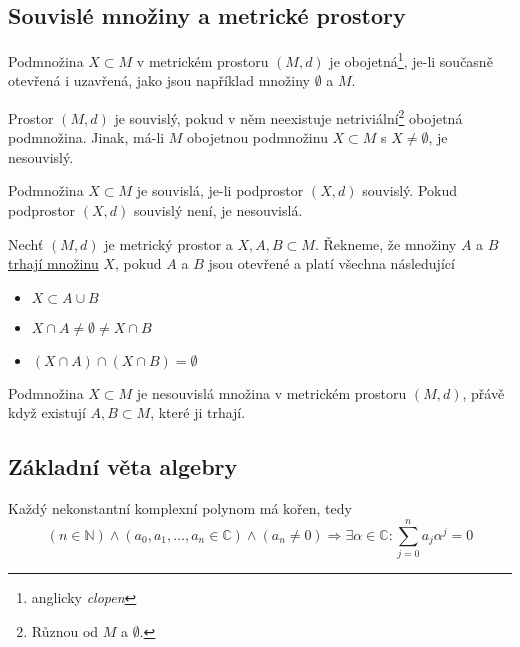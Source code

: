 \documentclass[../main.tex]{subfiles}
\begin{document}
\subsection{Souvislé množiny a metrické prostory}

\begin{definition}
    Podmnožina $X \subset M$ v metrickém prostoru $(M,d)$ je obojetná\footnote{anglicky \textit{clopen}}, je-li současně
    otevřená i uzavřená, jako jsou například množiny $\emptyset$ a $M$.
\end{definition}

\begin{definition}
    Prostor $(M,d)$ je souvislý, pokud v něm neexistuje netriviální\footnote{Různou od $M$ a $\emptyset$.} obojetná podmnožina.
    Jinak, má-li $M$ obojetnou podmnožinu $X \subset M$ s $X \neq \emptyset$, je nesouvislý.
\end{definition}

\begin{definition}
    Podmnožina $X\subset M$ je souvislá, je-li podprostor $(X,d)$ souvislý.
    Pokud podprostor $(X,d)$ souvislý není, je nesouvislá.
\end{definition}

\begin{definition}
    Nechť $(M,d)$ je metrický prostor a $X,A,B \subset M$. Řekneme, že množiny $A$ a $B$ \underline{trhají množinu} $X$, pokud
    $A$ a $B$ jsou otevřené a platí všechna následující 
    \begin{itemize}
        \item $X \subset A \cup B$
        \item $X \cap A \neq \emptyset \neq X \cap B$
        \item $(X \cap A) \cap (X \cap B) = \emptyset$
    \end{itemize}
\end{definition}

\begin{lemma}
    Podmnožina $X \subset M$ je nesouvislá množina v metrickém prostoru $(M,d)$, přávě
    když existují $A,B \subset M$, které ji trhají.
\end{lemma}

\subsection{Základní věta algebry}

\begin{theorem}
    Každý nekonstantní komplexní polynom má kořen, tedy
    \[ (n\in \mathbb{N})\land (a_0, a_1, \dots, a_n \in \mathbb{C}) \land (a_n \neq 0) \Rightarrow \exists \alpha \in \mathbb{C}: \sum_{j=0}^{n}a_j\alpha^j = 0 \]
\end{theorem}
\end{document}
